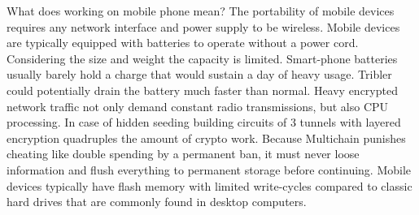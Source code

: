 What does working on mobile phone mean?
The portability of mobile devices requires any network interface and power supply to be wireless.
Mobile devices are typically equipped with batteries to operate without a power cord.
Considering the size and weight the capacity is limited.
Smart-phone batteries usually barely hold a charge that would sustain a day of heavy usage.
Tribler could potentially drain the battery much faster than normal.
Heavy encrypted network traffic not only demand constant radio transmissions, but also CPU processing.
In case of hidden seeding building circuits of 3 tunnels with layered encryption quadruples  the amount of crypto work.
Because Multichain punishes cheating like double spending by a permanent ban, it must never loose information and flush everything to permanent storage before continuing.
Mobile devices typically have flash memory with limited write-cycles compared to classic hard drives that are commonly found in desktop computers.

